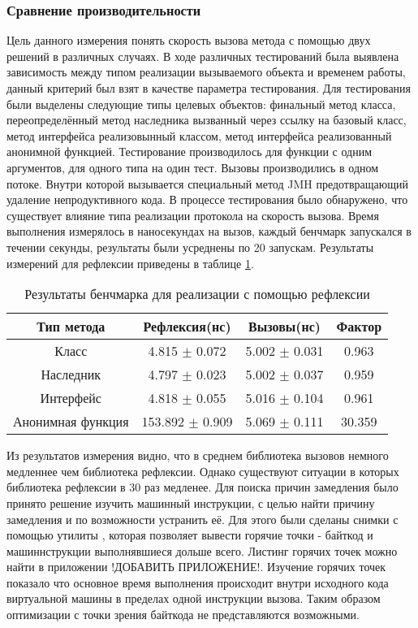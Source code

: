 \subsubsection{Сравнение производительности}
Цель данного измерения понять скорость вызова метода с помощью двух решений в различных случаях. В ходе различных тестирований была выявлена зависимость между типом реализации вызываемого объекта и временем работы, данный критерий был взят в качестве параметра тестирования. Для тестирования были выделены следующие типы целевых объектов: финальный метод класса, переопределённый метод наследника вызванный через ссылку на базовый класс, метод интерфейса реализовынный классом, метод интерфейса реализованный анонимной функцией. Тестирование производилось для функции с одним аргументов, для одного типа на один тест. Вызовы производились в одном потоке. Внутри которой вызывается специальный метод JMH предотвращающий удаление непродуктивного кода. В процессе тестирования было обнаружено, что существует влияние типа реализации протокола на скорость вызова. Время выполнения измерялось в наносекундах на вызов, каждый бенчмарк запускался в течении секунды, результаты были усреднены по 20 запускам. Результаты измерений для рефлексии приведены в таблице \ref{benchmark:prototype}.
\begin{table}[h]
\begin{center}
\begin{tabular}{|c|c|c|c|} \hline
Тип метода & Рефлексия(нс) &  Вызовы(нс) & Фактор \\ \hline
Класс & 4.815 $\pm$ 0.072 & 5.002 $\pm$ 0.031 & 0.963 \\ \hline
Наследник & 4.797 $\pm$ 0.023 & 5.002 $\pm$ 0.037 & 0.959 \\ \hline
Интерфейс & 4.818 $\pm$ 0.055 & 5.016 $\pm$ 0.104 & 0.961 \\ \hline
Анонимная функция & 153.892 $\pm$ 0.909 & 5.069 $\pm$ 0.111 & 30.359 \\ \hline
\end{tabular}
\caption{Результаты бенчмарка для реализации с помощью рефлексии}
\label{benchmark:prototype}
\end{center}
\end{table}

Из результатов измерения видно, что в среднем библиотека вызовов немного медленнее чем библиотека рефлексии. Однако существуют ситуации в которых библиотека рефлексии в 30 раз медленее. Для поиска причин замедления было принято решение изучить машинный инструкции, с целью найти причину замедления и по возможности устранить её. Для этого были сделаны снимки с помощью утилиты , которая позволяет вывести горячие точки - байткод и машиннструкции выполнявшиеся дольше всего. Листинг горячих точек можно найти в приложении !ДОБАВИТЬ ПРИЛОЖЕНИЕ!. Изучение горячих точек показало что основное время выполнения происходит внутри исходного кода виртуальной машины в пределах одной инструкции вызова. Таким образом оптимизации с точки зрения байткода не представляются возможными.

